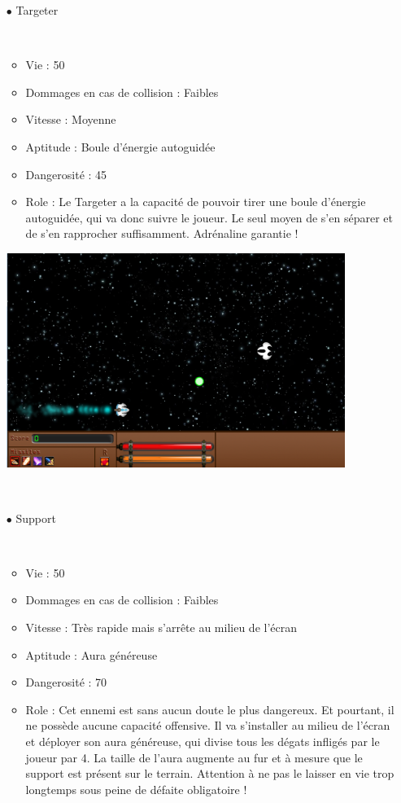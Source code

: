 \begin{itemize}
				\par~
				\item[$\bullet$ Targeter]
				\par~
				\begin{itemize}
					\item Vie : 50
					\item Dommages en cas de collision : Faibles
					\item Vitesse : Moyenne
					\item Aptitude : Boule d'énergie autoguidée
					\item Dangerosité : 45%
					\item Role : Le Targeter a la capacité de pouvoir tirer une boule d'énergie autoguidée, qui va donc suivre le joueur. Le seul moyen de s'en séparer et de s'en rapprocher suffisamment. Adrénaline garantie !
				\end{itemize}
\includegraphics[width=11cm]{images/vaisseaux/targeter.png}
				\par~
				\item[$\bullet$ Support]
				\par~
				\begin{itemize}
					\item Vie : 50
					\item Dommages en cas de collision : Faibles
					\item Vitesse : Très rapide mais s'arrête au milieu de l'écran
					\item Aptitude : Aura généreuse
					\item Dangerosité : 70%
					\item Role : Cet ennemi est sans aucun doute le plus dangereux. Et pourtant, il ne possède aucune capacité offensive. Il va s'installer au milieu de l'écran et déployer son aura généreuse, qui divise tous les dégats infligés par le joueur par 4. La taille de l'aura augmente au fur et à mesure que le support est présent sur le terrain. Attention à ne pas le laisser en vie trop longtemps sous peine de défaite obligatoire !

\end{itemize}
\end{itemize}
